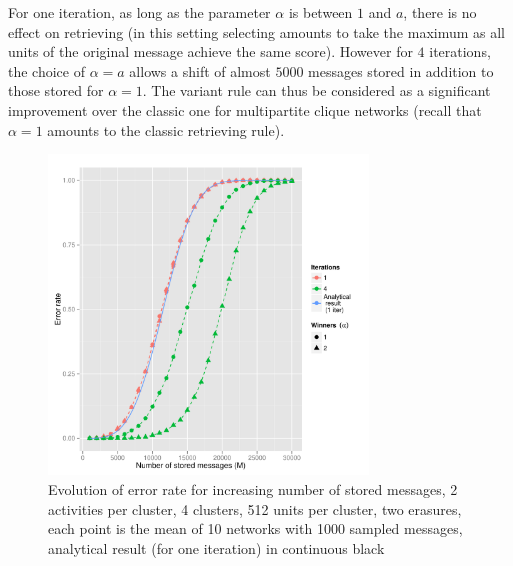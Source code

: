 \documentclass[english,10pt,twocolumn]{IEEEtran}
\theoremstyle{definition}
\begin{document}
		 For one iteration, as long as the parameter $\alpha$ is between $1$ and $a$, there is no effect on retrieving (in this setting selecting amounts to take the maximum as all units of the original message achieve the same score). However for $4$ iterations, the choice of $\alpha = a$ allows a shift of almost $5000$ messages stored in addition to those stored for $\alpha = 1$. The variant rule can thus be considered as a significant improvement over the classic one for multipartite clique networks (recall that $\alpha = 1$ amounts to the classic retrieving rule).
		
		
	

	
	
	
		
	
	
	
		
		\begin{figure}[!htb]
		\includegraphics[width=8.5cm]{Courbes/fig3c4l512e2a2} %
		\caption{Evolution of error rate for increasing number of stored messages, 2 activities per cluster, 4 clusters, 512 units per cluster, two erasures, each point is the mean of 10 networks with 1000 sampled messages, analytical result (for one iteration) in continuous black}
			\label{erasuresth}
		\end{figure}		
		
\end{document}
